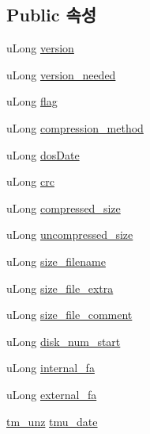 \subsection*{Public 속성}
\begin{DoxyCompactItemize}
\item 
u\+Long \mbox{\hyperlink{structunz__file__info__s_a635f933b26b636d8314cef61af62fcef}{version}}
\item 
u\+Long \mbox{\hyperlink{structunz__file__info__s_a1578aca2bb7fed658f9f94c78d00288e}{version\+\_\+needed}}
\item 
u\+Long \mbox{\hyperlink{structunz__file__info__s_adff7171a3114d55e5532c593b1779ecc}{flag}}
\item 
u\+Long \mbox{\hyperlink{structunz__file__info__s_aaaca88f0ebec5c1cfebb436b8e70a774}{compression\+\_\+method}}
\item 
u\+Long \mbox{\hyperlink{structunz__file__info__s_a14bd7da84cada0f4b1455d60274eef91}{dos\+Date}}
\item 
u\+Long \mbox{\hyperlink{structunz__file__info__s_a6d741cb2df07794d7a4794841148893b}{crc}}
\item 
u\+Long \mbox{\hyperlink{structunz__file__info__s_a35ee9d733879c87565e40a545fe46fb6}{compressed\+\_\+size}}
\item 
u\+Long \mbox{\hyperlink{structunz__file__info__s_a7696a98511bc57e389485e5313a9c2bf}{uncompressed\+\_\+size}}
\item 
u\+Long \mbox{\hyperlink{structunz__file__info__s_ae4f2f81a5301f7df9014838a56a496c6}{size\+\_\+filename}}
\item 
u\+Long \mbox{\hyperlink{structunz__file__info__s_a479402dcb3555c922e3ce87c8f967990}{size\+\_\+file\+\_\+extra}}
\item 
u\+Long \mbox{\hyperlink{structunz__file__info__s_afa9feffb3b9c9c03e02599118d5f548e}{size\+\_\+file\+\_\+comment}}
\item 
u\+Long \mbox{\hyperlink{structunz__file__info__s_ab7bfba2b7d0cdb7260a7cd9f9ccd00ff}{disk\+\_\+num\+\_\+start}}
\item 
u\+Long \mbox{\hyperlink{structunz__file__info__s_aa20738bf82bca71cc950b9475b5d8c3c}{internal\+\_\+fa}}
\item 
u\+Long \mbox{\hyperlink{structunz__file__info__s_ae3365fdb260668fca60bfb975b1513aa}{external\+\_\+fa}}
\item 
\mbox{\hyperlink{unzip_8h_a369a14c48c4b71afa6bf6cf95c6b9160}{tm\+\_\+unz}} \mbox{\hyperlink{structunz__file__info__s_ad52c08c65349f674b00244d81cdb1736}{tmu\+\_\+date}}
\end{DoxyCompactItemize}


